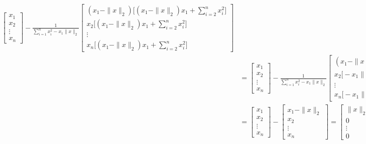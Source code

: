 \documentclass{article}
\newcommand{\twonorm}[1]{\| #1 \|_2}
\begin{document}
\begin{enumerate}
{\begin{align*}
\begin{bmatrix}
        x_1 \\
        x_2 \\
        \vdots \\
        x_n
      \end{bmatrix}
     - \frac{1}{\sum_{i=1}^{n}x_i^2 - x_1\twonorm{x}}
     \begin{bmatrix}
        (x_1 - \twonorm{x}) \Big[ (x_1 - \twonorm{x})x_1 + \sum_{i=2}^{n}x_i^2 \Big] \\
        x_2 \Big[ (x_1 - \twonorm{x})x_1 + \sum_{i=2}^{n}x_i^2 \Big]\\
        \vdots  \\
        x_n \Big[ (x_1 - \twonorm{x})x_1 + \sum_{i=2}^{n}x_i^2 \Big] 
    \end{bmatrix} \\
      &= 
      \begin{bmatrix}
        x_1 \\
        x_2 \\
        \vdots \\
        x_n
      \end{bmatrix}
     - \frac{1}{\sum_{i=1}^{n}x_i^2 - x_1\twonorm{x}}
     \begin{bmatrix}
        (x_1 - \twonorm{x}) \Big[  - x_1\twonorm{x} + \sum_{i=1}^{n}x_i^2 \Big] \\
        x_2 \Big[ - x_1\twonorm{x} + \sum_{i=1}^{n}x_i^2 \Big]\\
        \vdots  \\
        x_n \Big[ - x_1\twonorm{x} + \sum_{i=1}^{n}x_i^2 \Big]
    \end{bmatrix} \\
    &= 
    \begin{bmatrix}
        x_1 \\
        x_2 \\
        \vdots \\
        x_n
      \end{bmatrix}
      -
     \begin{bmatrix}
        x_1 - \twonorm{x} \\
        x_2 \\
        \vdots  \\
        x_n
    \end{bmatrix} = 
     \begin{bmatrix}
        \twonorm{x} \\
        0\\
        \vdots  \\
        0
    \end{bmatrix} \text{As wanted}

\end{align*}}
\end{enumerate}
\end{document}
